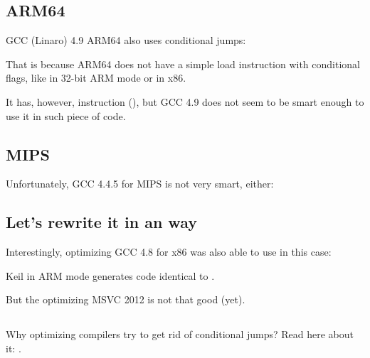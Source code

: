 

\subsection{ARM64}

\Optimizing GCC (Linaro) 4.9 \ForENRU ARM64 also uses conditional jumps:



That is because ARM64 does not have a simple load instruction with conditional flags,
like  in 32-bit ARM mode or  in x86.

It has, however,  instruction ()\cite[p390, C5.5]{ARM64ref},
but GCC 4.9 does not seem to be smart enough to use it in such piece of code.
\fi

\ifdefined\IncludeMIPS
\subsection{MIPS}

Unfortunately, GCC 4.4.5 for MIPS is not very smart, either:



\fi

\subsection{Let's rewrite it in an  way}




Interestingly, optimizing GCC 4.8 for x86 was also able to use  in this case:



\ifdefined\IncludeARM
\Optimizing Keil in ARM mode generates 
code identical to .
\fi

But the optimizing MSVC 2012 is not that good (yet).

\subsection{\Conclusion{}}

Why optimizing compilers try to get rid of conditional jumps? Read here about it: .
